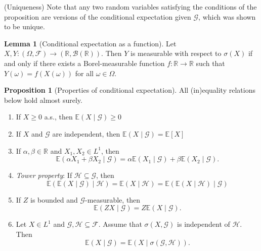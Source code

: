 \documentclass[parskip=full]{article}
\theoremstyle{definition}
\newtheorem{proposition}{Proposition}[section]
\newtheorem{lemma}{Lemma}[proposition]
\newcommand{\R}{\mathbb{R}}
\newcommand{\F}{\mathcal{F}}
\newcommand{\B}{\mathcal{B}}
\newcommand{\1}{\mathbbm{1}}
\newcommand{\E}{\mathbb{E}}
\begin{document}
(Uniqueness) Note that any two random variables satisfying the conditions of the proposition are versions of the conditional expectation given $\mathcal{G}$, which was shown to be unique.

\begin{lemma}[Conditional expectation as a function]
  Let $X, Y: (\Omega, \F) \to (\R, \B(\R))$. Then $Y$ is measurable with respect to $\sigma(X)$ if and only if there exists a Borel-measurable function $f: \R \to \R$ such that $Y(\omega) = f(X(\omega))$ for all $\omega \in \Omega$.
\end{lemma}


\begin{proposition}[Properties of conditional expectation]
  All (in)equality relations below hold almost surely.
  \begin{enumerate}
    \item If $X \geq 0$ a.s., then $\E(X \mid \mathcal{G}) \geq 0$
    \item If $X$ and $\mathcal{G}$ are independent, then $\E(X \mid \mathcal{G}) = \E[X]$
    \item If $\alpha, \beta \in \R$ and $X_1, X_2 \in L^1$, then
          \[
            \E(\alpha X_1 + \beta X_2 \mid \mathcal{G}) = \alpha \E(X_1 \mid\mathcal{G}) + \beta \E(X_2 \mid \mathcal{G}).
          \]
    \item \emph{Tower property}: If $\mathcal{H} \subseteq \mathcal{G}$, then
          \[
            \E(\E(X \mid \mathcal{G}) \mid \mathcal{H}) = \E(X \mid \mathcal{H}) = \E(\E(X \mid \mathcal{H}) \mid \mathcal{G})
          \]
    \item If $Z$ is bounded and $\mathcal{G}$-measurable, then
          \[
            \E(ZX \mid \mathcal{G}) = Z \E(X \mid \mathcal{G}).
          \]
    \item Let $X \in L^1$ and $\mathcal{G}, \mathcal{H} \subseteq \mathcal{F}$. Assume that $\sigma(X, \mathcal{G})$ is independent of $\mathcal{H}$. Then
          \[
            \E (X \mid \mathcal{G}) = \E(X \mid \sigma(\mathcal{G}, \mathcal{H})).
          \]
  \end{enumerate}
\end{proposition}
\end{document}
